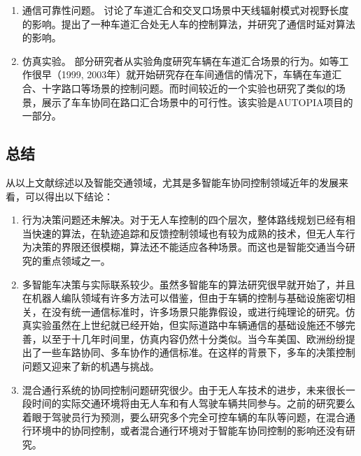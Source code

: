 \begin{enumerate}[wide=\parindent]
\begin{enumerate}[label=(\arabic*),wide=\parindent]
\item 通信可靠性问题。
讨论了车道汇合和交叉口场景中天线辐射模式对视野长度的影响。提出了一种车道汇合处无人车的控制算法，并研究了通信时延对算法的影响。

\item 仿真实验。
部分研究者从实验角度研究车辆在车道汇合场景的行为。如等工作很早（1999, 2003年）就开始研究存在车间通信的情况下，车辆在车道汇合、十字路口等场景的控制问题。而时间较近的一个实验\cite{Milanes2011Automated}也研究了类似的场景，展示了车车协同在路口汇合场景中的可行性。该实验是AUTOPIA\cite{Milan2011AUTOPIA}项目的一部分。
\end{enumerate}

\subsection{总结}
\label{ssec:intro:summary}
从以上文献综述以及智能交通领域，尤其是多智能车协同控制领域近年的发展来看，可以得出以下结论：

\begin{enumerate}[label=(\arabic*),wide=\parindent]
\item 行为决策问题还未解决。对于无人车控制的四个层次，整体路线规划已经有相当快速的算法，在轨迹追踪和反馈控制领域也有较为成熟的技术，但无人车行为决策的界限还很模糊，算法还不能适应各种场景。而这也是智能交通当今研究的重点领域之一。
\item 多智能车决策与实际联系较少。虽然多智能车的算法研究很早就开始了，并且在机器人编队领域有许多方法可以借鉴，但由于车辆的控制与基础设施密切相关，在没有统一通信标准时，许多场景只能靠假设，或进行纯理论的研究。仿真实验虽然在上世纪就已经开始，但实际道路中车辆通信的基础设施还不够完善，以至于十几年时间里，仿真内容仍然十分类似。当今车美国、欧洲纷纷提出了一些车路协同、多车协作的通信标准\cite{Chen2014Cooperative}。在这样的背景下，多车的决策控制问题又迎来了新的机遇与挑战。
\item 混合通行系统的协同控制问题研究很少。由于无人车技术的进步，未来很长一段时间的实际交通环境将由无人车和有人驾驶车辆共同参与。之前的研究要么着眼于驾驶员行为预测，要么研究多个完全可控车辆的车队等问题，在混合通行环境中的协同控制，或者混合通行环境对于智能车协同控制的影响还没有研究。
\end{enumerate}

\end{enumerate}

